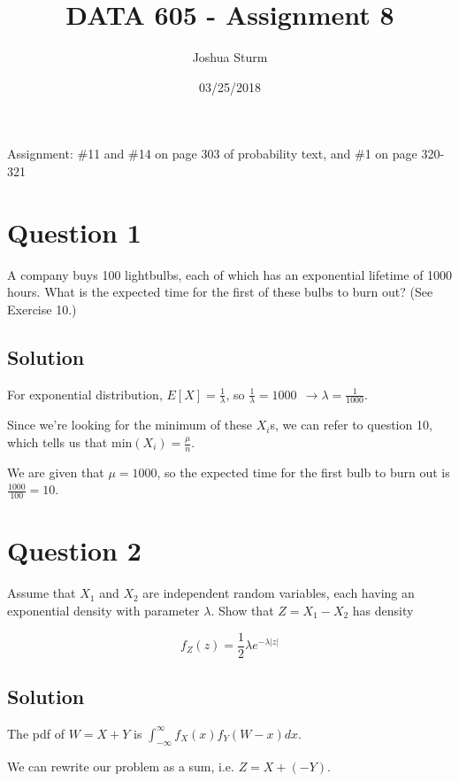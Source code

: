 \documentclass[]{article}
\title{DATA 605 - Assignment 8}
\author{Joshua Sturm}
\date{03/25/2018}
\begin{document}
\maketitle

Assignment: \#11 and \#14 on page 303 of probability text, and \#1 on
page 320-321

\section{Question 1}\label{question-1}

A company buys 100 lightbulbs, each of which has an exponential lifetime
of 1000 hours. What is the expected time for the first of these bulbs to
burn out? (See Exercise 10.)

\subsection{Solution}\label{solution}

For exponential distribution, \(E[X] = \frac{1}{\lambda}\), so
\(\frac{1}{\lambda} = 1000 \ \ \to \lambda = \frac{1}{1000}\).

Since we're looking for the minimum of these \(X_i\)s, we can refer to
question 10, which tells us that min\((X_i) = \frac{\mu}{n}\).

We are given that \(\mu = 1000\), so the expected time for the first
bulb to burn out is \(\frac{1000}{100} = 10\).

\section{Question 2}\label{question-2}

Assume that \(X_1\) and \(X_2\) are independent random variables, each
having an exponential density with parameter \(\lambda\). Show that
\(Z = X_1 - X_2\) has density

\begin{equation*}
f_Z(z) = \frac{1}{2}\lambda e^{-\lambda|z|}
\end{equation*}

\subsection{Solution}\label{solution-1}

The pdf of \(W = X + Y\) is
\(\int_{-\infty}^{\infty}f_X(x)f_Y(W - x)dx\).

We can rewrite our problem as a sum, i.e. \(Z = X + (-Y)\).
\end{document}

